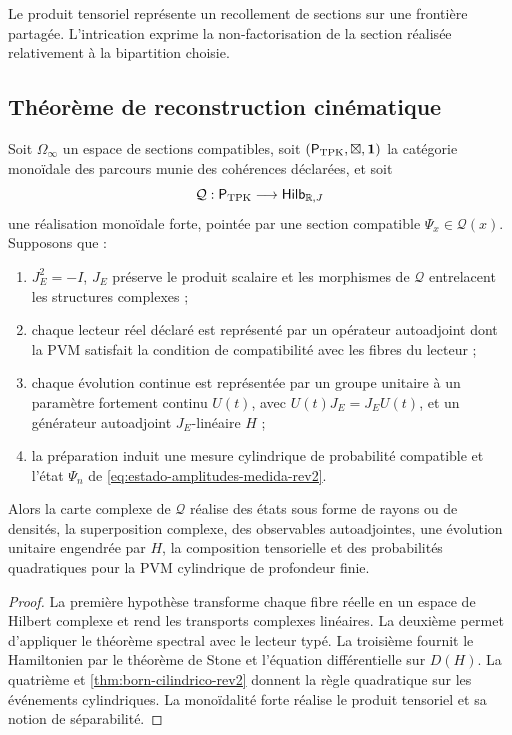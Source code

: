 \begin{principle}
Le produit tensoriel représente un recollement de sections sur une frontière partagée. L’intrication exprime la non-factorisation de la section réalisée relativement à la bipartition choisie.
\end{principle}

\subsection{Théorème de reconstruction cinématique}

\begin{theorem}
\label{thm:cinematica-cuantica-tpk-rev2}
Soit \(\Omega_\infty\) un espace de sections compatibles, soit \((\mathsf P_{\rm TPK},\boxtimes,\mathbf 1)\) la catégorie monoïdale des parcours munie des cohérences déclarées, et soit
\[
 \mathcal Q:\mathsf P_{\rm TPK}\longrightarrow
 \mathsf{Hilb}_{\mathbb R,J}
\]
une réalisation monoïdale forte, pointée par une section compatible \(\Psi_x\in\mathcal Q(x)\). Supposons que :
\begin{enumerate}
 \item \(J_E^2=-I\), \(J_E\) préserve le produit scalaire et les morphismes de \(\mathcal Q\) entrelacent les structures complexes ;
 \item chaque lecteur réel déclaré est représenté par un opérateur autoadjoint dont la PVM satisfait la condition de compatibilité avec les fibres du lecteur ;
 \item chaque évolution continue est représentée par un groupe unitaire à un paramètre fortement continu \(U(t)\), avec \(U(t)J_E=J_EU(t)\), et un générateur autoadjoint \(J_E\)-linéaire \(H\) ;
 \item la préparation induit une mesure cylindrique de probabilité compatible et l’état \(\Psi_n\) de \eqref{eq:estado-amplitudes-medida-rev2}.
\end{enumerate}
Alors la carte complexe de \(\mathcal Q\) réalise des états sous forme de rayons ou de densités, la superposition complexe, des observables autoadjointes, une évolution unitaire engendrée par \(H\), la composition tensorielle et des probabilités quadratiques pour la PVM cylindrique de profondeur finie.
\end{theorem}

\begin{proof}
La première hypothèse transforme chaque fibre réelle en un espace de Hilbert complexe et rend les transports complexes linéaires. La deuxième permet d’appliquer le théorème spectral avec le lecteur typé. La troisième fournit le Hamiltonien par le théorème de Stone et l’équation différentielle sur \(D(H)\). La quatrième et \cref{thm:born-cilindrico-rev2} donnent la règle quadratique sur les événements cylindriques. La monoïdalité forte réalise le produit tensoriel et sa notion de séparabilité.
\end{proof}


